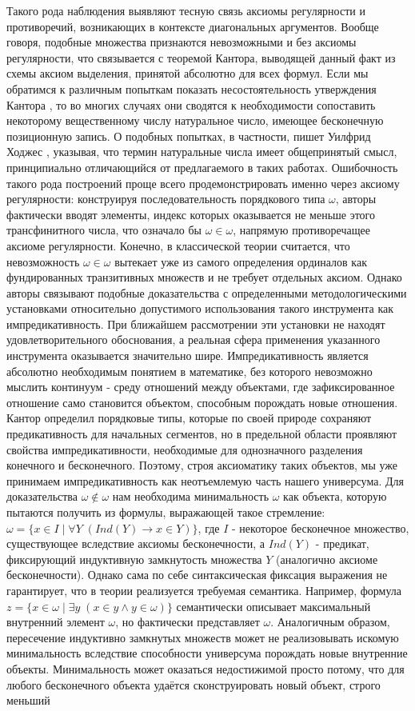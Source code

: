 \documentclass[12pt]{article}
\begin{document}
Такого рода наблюдения выявляют тесную связь аксиомы регулярности и противоречий, возникающих в контексте диагональных аргументов. Вообще говоря, подобные множества признаются невозможными и без аксиомы регулярности, что связывается с теоремой Кантора, выводящей данный факт из схемы аксиом выделения, принятой абсолютно для всех формул. Если мы обратимся к различным попыткам показать несостоятельность утверждения Кантора \cite{count-random}, то во многих случаях они сводятся к необходимости сопоставить некоторому вещественному числу натуральное число, имеющее бесконечную позиционную запись. О подобных попытках, в частности, пишет Уилфрид Ходжес \cite{hodges}, указывая, что термин натуральные числа имеет общепринятый смысл, принципиально отличающийся от предлагаемого в таких работах. Ошибочность такого рода построений проще всего продемонстрировать именно через аксиому регулярности: конструируя последовательность порядкового типа $\omega$, авторы фактически вводят элементы, индекс которых оказывается не меньше этого трансфинитного числа, что означало бы $\omega \in \omega$, напрямую противоречащее аксиоме регулярности. Конечно, в классической теории считается, что невозможность $\omega \in \omega$ вытекает уже из самого определения ординалов как фундированных транзитивных множеств и не требует отдельных аксиом. Однако авторы связывают подобные доказательства с определенными методологическими установками относительно допустимого использования такого инструмента как импредикативность. При ближайшем рассмотрении эти установки не находят удовлетворительного обоснования, а реальная сфера применения указанного инструмента оказывается значительно шире. Импредикативность является абсолютно необходимым понятием в математике, без которого невозможно мыслить континуум - среду отношений между объектами, где зафиксированное отношение само становится объектом, способным порождать новые отношения. Кантор определил порядковые типы, которые по своей природе сохраняют предикативность для начальных сегментов, но в предельной области проявляют свойства импредикативности, необходимые для однозначного разделения конечного и бесконечного. Поэтому, строя аксиоматику таких объектов, мы уже принимаем импредикативность как неотъемлемую часть нашего универсума. Для доказательства $\omega \notin \omega$ нам необходима минимальность $\omega$ как объекта, которую пытаются получить из формулы, выражающей такое стремление: $\omega = \{ x \in I \mid \forall Y \; (Ind(Y) \to x \in Y) \}$, где $I$ - некоторое бесконечное множество, существующее вследствие аксиомы бесконечности, а $Ind(Y)$ - предикат, фиксирующий индуктивную замкнутость множества $Y$ (аналогично аксиоме бесконечности). Однако сама по себе синтаксическая фиксация выражения не гарантирует, что в теории реализуется требуемая семантика. Например, формула $z = \{ x \in \omega \mid \exists y \; (x \in y \wedge y \in \omega) \}$ семантически описывает максимальный внутренний элемент $\omega$, но фактически представляет $\omega$. Аналогичным образом, пересечение индуктивно замкнутых множеств может не реализовывать искомую минимальность вследствие способности универсума порождать новые внутренние объекты. Минимальность может оказаться недостижимой просто потому, что для любого бесконечного объекта удаётся сконструировать новый объект, строго меньший 
\end{document}

